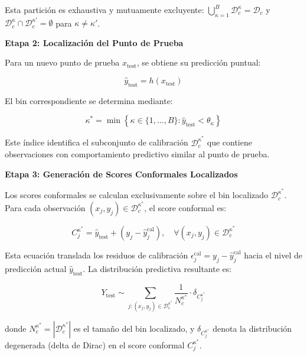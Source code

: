 Esta partición es exhaustiva y mutuamente excluyente: $\bigcup_{\kappa=1}^B \mathcal{D}_c^{\kappa} = \mathcal{D}_c$ y $\mathcal{D}_c^{\kappa} \cap \mathcal{D}_c^{\kappa'} = \emptyset$ para $\kappa \neq \kappa'$.

\textbf{Etapa 2: Localización del Punto de Prueba}

Para un nuevo punto de prueba $x_{\text{test}}$, se obtiene su predicción puntual:

\begin{equation}
\hat{y}_{\text{test}} = h(x_{\text{test}})
\end{equation}

El bin correspondiente se determina mediante:

\begin{equation}
\kappa^* = \min\left\{\kappa \in \{1, \ldots, B\} : \hat{y}_{\text{test}} < \theta_{\kappa}\right\}
\label{eq:mcps_bin_assignment}
\end{equation}

Este índice identifica el subconjunto de calibración $\mathcal{D}_c^{\kappa^*}$ que contiene observaciones con comportamiento predictivo similar al punto de prueba.

\textbf{Etapa 3: Generación de Scores Conformales Localizados}

Los scores conformales se calculan exclusivamente sobre el bin localizado $\mathcal{D}_c^{\kappa^*}$. Para cada observación $(x_j, y_j) \in \mathcal{D}_c^{\kappa^*}$, el score conformal es:

\begin{equation}
C_j^{\kappa^*} = \hat{y}_{\text{test}} + \left(y_j - \hat{y}_j^{\text{cal}}\right), \quad \forall (x_j, y_j) \in \mathcal{D}_c^{\kappa^*}
\label{eq:mcps_calibration_scores}
\end{equation}

Esta ecuación translada los residuos de calibración $\epsilon_j^{\text{cal}} = y_j - \hat{y}_j^{\text{cal}}$ hacia el nivel de predicción actual $\hat{y}_{\text{test}}$. La distribución predictiva resultante es:

\begin{equation}
Y_{\text{test}} \sim \sum_{j: (x_j, y_j) \in \mathcal{D}_c^{\kappa^*}} \frac{1}{N_c^{\kappa^*}} \cdot \delta_{C_j^{\kappa^*}}
\label{eq:mcps_predictive_dist}
\end{equation}

donde $N_c^{\kappa^*} = |\mathcal{D}_c^{\kappa^*}|$ es el tamaño del bin localizado, y $\delta_{C_j^{\kappa^*}}$ denota la distribución degenerada (delta de Dirac) en el score conformal $C_j^{\kappa^*}$.

